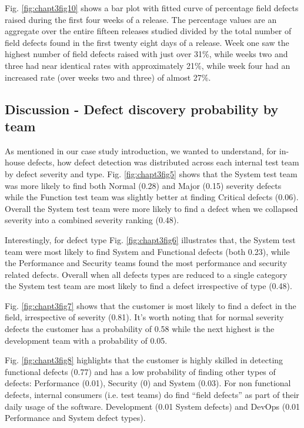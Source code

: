Fig. \ref{fig:chapt3fig10} shows a bar plot with fitted curve of percentage field defects raised during the first four weeks of a release. The percentage values are an aggregate over the entire fifteen releases studied divided by the total number of field defects found in the first twenty eight days of a release. Week one saw the highest number of field defects raised with just over 31\%, while weeks two and three had near identical rates with approximately 21\%, while week four had an increased rate (over weeks two and three) of almost 27\%.




\subsection{Discussion - Defect discovery probability by team}

As mentioned in our case study introduction, we wanted to understand, for in-house defects, how defect detection was distributed across each internal test team by defect severity and type. Fig. \ref{fig:chapt3fig5} shows that the System test team was more likely to find both Normal (0.28) and Major (0.15) severity defects while the Function test team was slightly better at finding Critical defects (0.06). Overall the System test team were more likely to find a defect when we collapsed severity into a combined severity ranking (0.48). \par 

Interestingly, for defect type Fig. \ref{fig:chapt3fig6} illustrates that, the System test team were most likely to find System and 
Functional defects (both 0.23), while the Performance and Security teams found the most performance and security
related defects. Overall when all defects types are reduced to a single category the System test team are most likely to find a defect irrespective of type (0.48). \par

Fig. \ref{fig:chapt3fig7} shows that the customer is most likely to find a defect in the field, irrespective of severity (0.81). It's worth noting that for normal severity defects the customer has a probability of 0.58 while the next highest is the development team with a probability of 0.05.\par 

Fig. \ref{fig:chapt3fig8} highlights that the customer is highly skilled in detecting functional defects (0.77) and has a low probability of finding other types of defects: Performance (0.01), Security (0) and System (0.03). For non functional defects, internal consumers (i.e. test teams) do find ``field defects'' as part of their daily usage of the software. Development (0.01 System defects) and DevOps (0.01 Performance and System defect types). \par 


